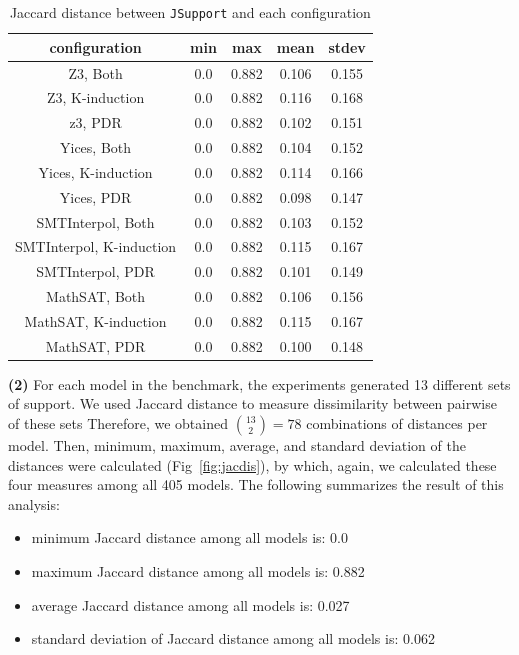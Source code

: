 \begin{table}
  \centering
  \begin{tabular}{|c|c|c|c|c|}
    \hline
    configuration & min & max & mean & stdev  \\[0.5ex]
    \hline\hline
    Z3, Both & 0.0 & 0.882 & 0.106 & 0.155 \\[0.5ex]
    Z3, K-induction & 0.0 & 0.882 & 0.116 & 0.168 \\[0.5ex]
    z3, PDR & 0.0 & 0.882 & 0.102 & 0.151 \\[0.5ex]
    \hline
    Yices, Both & 0.0 & 0.882 & 0.104 & 0.152 \\[0.5ex]
    Yices, K-induction & 0.0 & 0.882 & 0.114 & 0.166 \\[0.5ex]
    Yices, PDR & 0.0 & 0.882 & 0.098 & 0.147 \\[0.5ex]
    \hline
    SMTInterpol, Both & 0.0 & 0.882 & 0.103 & 0.152 \\[0.5ex]
    SMTInterpol, K-induction & 0.0 & 0.882 & 0.115 & 0.167 \\[0.5ex]
    SMTInterpol, PDR & 0.0 & 0.882 & 0.101 & 0.149 \\[0.5ex]
    \hline
    MathSAT, Both & 0.0 & 0.882 & 0.106 & 0.156 \\[0.5ex]
    MathSAT, K-induction & 0.0 & 0.882 & 0.115 & 0.167 \\[0.5ex]
    MathSAT, PDR & 0.0 & 0.882 & 0.100 & 0.148 \\[0.5ex]
    \hline
  \end{tabular}
  \caption{Jaccard distance between \texttt{JSupport} and each configuration}\label{tab:jsupconf}
\end{table}

\vspace{6pt}
\noindent{}
 \vspace{6pt}

\textbf{(2)} For each model in the benchmark, the experiments generated 13 different sets of support.
We used Jaccard distance to measure dissimilarity between pairwise of these sets
Therefore, we obtained $\binom{13}{2} = 78$ combinations of distances per model. Then, minimum, maximum, average, and standard deviation of the distances were calculated (Fig~\ref{fig:jacdis}), by which, again, we calculated these four measures among all 405 models. The following summarizes the result of this analysis:
\begin{itemize}
  \item minimum Jaccard distance among all models is: 0.0
  \item maximum Jaccard distance among all models is: 0.882
  \item average Jaccard distance among all models is: 0.027
  \item standard deviation of Jaccard distance among all models is: 0.062
\end{itemize}

